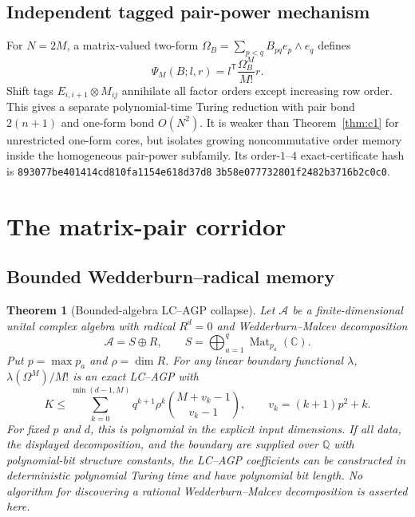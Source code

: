 \documentclass[11pt]{article}
\newtheorem{theorem}{Theorem}[section]
\theoremstyle{definition}
\newcommand{\Mat}{\operatorname{Mat}}
\begin{document}
\subsection{Independent tagged pair-power mechanism}

For $N=2M$, a matrix-valued two-form
$\Omega_B=\sum_{p<q}B_{pq}e_p\wedge e_q$ defines
\[
 \Psi_M(B;l,r)=l^{\mathsf T}\frac{\Omega_B^M}{M!}r.
\]
Shift tags $E_{i,i+1}\otimes M_{ij}$ annihilate all factor orders except
increasing row order.  This gives a separate polynomial-time Turing reduction
with pair bond $2(n+1)$ and one-form bond $O(N^2)$.  It is weaker than
Theorem~\ref{thm:c1} for unrestricted one-form cores, but isolates growing
noncommutative order memory inside the homogeneous pair-power subfamily.  Its
order-$1$--$4$ exact-certificate hash is
\texttt{893077be401414cd810fa1154e618d37d8}\allowbreak
\texttt{3b58e077732801f2482b3716b2c0c0}.

\section{The matrix-pair corridor}

\subsection{Bounded Wedderburn--radical memory}

\begin{theorem}[Bounded-algebra LC--AGP collapse]
Let $\mathcal A$ be a finite-dimensional unital complex algebra with radical
$R^d=0$ and Wedderburn--Malcev decomposition
\[
 \mathcal A=S\oplus R,\qquad
 S=\bigoplus_{a=1}^q\Mat_{p_a}(\mathbb C).
\]
Put $p=\max p_a$ and $\rho=\dim R$.  For any linear boundary functional
$\lambda$, $\lambda(\Omega^M)/M!$ is an exact LC--AGP with
\[
 K\le \sum_{k=0}^{\min(d-1,M)}q^{k+1}\rho^k
 \binom{M+v_k-1}{v_k-1},\qquad v_k=(k+1)p^2+k.
 \label{eq:bounded-collapse}
\]
For fixed $p$ and $d$, this is polynomial in the explicit input dimensions.
If all data, the displayed decomposition, and the boundary are supplied over
$\mathbb Q$ with polynomial-bit structure constants, the LC--AGP coefficients
can be constructed in deterministic polynomial Turing time and have
polynomial bit length.  No algorithm for discovering a rational
Wedderburn--Malcev decomposition is asserted here.
\end{theorem}
\end{document}
